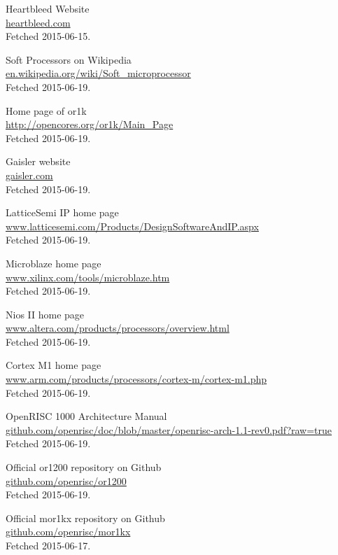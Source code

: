 \documentclass[11pt,a4paper,twoside,openany]{report}
\begin{document}
\begin{thebibliography}{99}

  Heartbleed Website\\
  \url{heartbleed.com}\\
  Fetched 2015-06-15.

	Soft Processors on Wikipedia\\
	\url{en.wikipedia.org/wiki/Soft_microprocessor}\\
	Fetched 2015-06-19.

	Home page of or1k\\
	\url{http://opencores.org/or1k/Main_Page}\\
	Fetched 2015-06-19.

	Gaisler website\\
	\url{gaisler.com}\\
	Fetched 2015-06-19.

	LatticeSemi IP home page\\
	\url{www.latticesemi.com/Products/DesignSoftwareAndIP.aspx}\\
	Fetched 2015-06-19.

	Microblaze home page\\
	\url{www.xilinx.com/tools/microblaze.htm}\\
	Fetched 2015-06-19.

	Nios II home page\\
	\url{www.altera.com/products/processors/overview.html}\\
	Fetched 2015-06-19.

	Cortex M1 home page\\
	\url{www.arm.com/products/processors/cortex-m/cortex-m1.php}\\
	Fetched 2015-06-19.
	
	OpenRISC 1000 Architecture Manual\\
	\url{github.com/openrisc/doc/blob/master/openrisc-arch-1.1-rev0.pdf?raw=true}\\
	Fetched 2015-06-19.

	Official or1200 repository on Github\\
	\url{github.com/openrisc/or1200}\\
	Fetched 2015-06-19.

	Official mor1kx repository on Github\\
	\url{github.com/openrisc/mor1kx}\\
	Fetched 2015-06-17.
	

\end{thebibliography}
\end{document}
